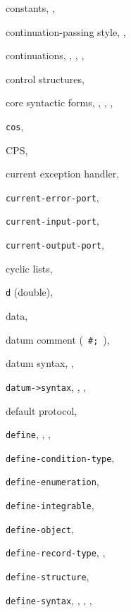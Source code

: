 {\begin{multicols}{2}
constants, \pageref{start_s42}, \pageref{objects_s4}
  
continuation-passing style, \pageref{further_s71}, \pageref{examples_s77}
  
continuations, \pageref{intro_s24}, \pageref{further_s61}, \pageref{control_s57}, \pageref{examples_s88}
  
control structures, \pageref{control_s0}
  
core syntactic forms, \pageref{intro_s6}, \pageref{start_s47}, \pageref{further_s0}, \pageref{examples_s51}
  
\texttt{cos}, \textit{\pageref{objects_s131}}
  
CPS, \pageref{further_s72}
  
current exception handler, \pageref{exceptions_s2}
  
\texttt{current-error-port}, \textit{\pageref{io_s32}}
  
\texttt{current-input-port}, \textit{\pageref{io_s32}}
  
\texttt{current-output-port}, \textit{\pageref{io_s32}}
  
cyclic lists, \pageref{start_s198}
  
\texttt{d} (double), \pageref{objects_s84}
  
data, \pageref{objects_s3}
  
datum comment ( \texttt{\#{};} ), \pageref{grammar_s9}
  
datum syntax, \pageref{grammar_s0}, \pageref{grammar_s13}
  
\texttt{datum-\textgreater{}syntax}, \textit{\pageref{syntax_s45}}, \pageref{syntax_s65}, \pageref{syntax_s71}
  
default protocol, \pageref{records_s12}
  
\texttt{define}, \pageref{start_s78}, \pageref{further_s80}, \textit{\pageref{binding_s24}}
  
\texttt{define-condition-type}, \textit{\pageref{exceptions_s17}}
  
\texttt{define-enumeration}, \textit{\pageref{objects_s290}}
  
\texttt{define-integrable}, \pageref{syntax_s61}
  
\texttt{define-object}, \pageref{examples_s63}
  
\texttt{define-record-type}, \pageref{records_s1}, \textit{\pageref{records_s13}}
  
\texttt{define-structure}, \pageref{syntax_s70}
  
\texttt{define-syntax}, \pageref{further_s13}, \pageref{syntax_s3}, \textit{\pageref{syntax_s12}}, \pageref{examples_s17}
  

\end{multicols}}

